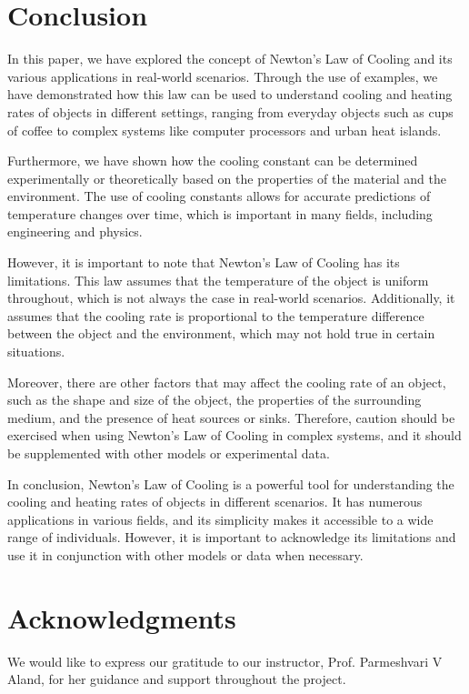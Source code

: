 \documentclass[12pt, a4paper]{article}
\begin{document}
\section{Conclusion}

In this paper, we have explored the concept of Newton's Law of Cooling and its various applications in real-world scenarios. Through the use of examples, we have demonstrated how this law can be used to understand cooling and heating rates of objects in different settings, ranging from everyday objects such as cups of coffee to complex systems like computer processors and urban heat islands.

Furthermore, we have shown how the cooling constant can be determined experimentally or theoretically based on the properties of the material and the environment. The use of cooling constants allows for accurate predictions of temperature changes over time, which is important in many fields, including engineering and physics.

However, it is important to note that Newton's Law of Cooling has its limitations. This law assumes that the temperature of the object is uniform throughout, which is not always the case in real-world scenarios. Additionally, it assumes that the cooling rate is proportional to the temperature difference between the object and the environment, which may not hold true in certain situations.

Moreover, there are other factors that may affect the cooling rate of an object, such as the shape and size of the object, the properties of the surrounding medium, and the presence of heat sources or sinks. Therefore, caution should be exercised when using Newton's Law of Cooling in complex systems, and it should be supplemented with other models or experimental data.

In conclusion, Newton's Law of Cooling is a powerful tool for understanding the cooling and heating rates of objects in different scenarios. It has numerous applications in various fields, and its simplicity makes it accessible to a wide range of individuals. However, it is important to acknowledge its limitations and use it in conjunction with other models or data when necessary.

\section*{Acknowledgments}
We would like to express our gratitude to our instructor, Prof. Parmeshvari V Aland, for her guidance and support throughout the project.
\end{document}

